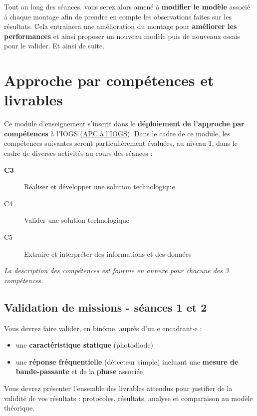 \documentclass[a4paper,11pt,twoside]{book} %
\begin{document}
{Tout au long des séances, vous serez alors amené à \textbf{modifier le modèle} associé à chaque montage afin de prendre en compte les observations faites sur les résultats. Cela entrainera une amélioration du montage pour \textbf{améliorer les performances} et ainsi proposer un nouveau modèle puis de nouveaux essais pour le valider. Et ainsi de suite.

\newpage
\section{Approche par compétences et livrables}

Ce module d'enseignement s'inscrit dans le \textbf{déploiement de l'approche par compétences} à l'IOGS (\href{https://tinyurl.com/APC-IOGS}{APC à l'IOGS}). Dans le cadre de ce module, les compétences suivantes seront particulièrement évaluées, au niveau 1, dans le cadre de diverses activités au cours des séances :

\begin{description}
	\item[\textbf{C3}] Réaliser et développer une solution technologique
	\item[C4] Valider une solution technologique
	\item[C5] Extraire et interpréter des informations et des données
\end{description}

\textit{La description des compétences est fournie en annexe pour chacune des 3 compétences.}


\subsection{Validation de missions - séances 1 et 2}

Vous devrez faire valider, en binôme, auprès d'un$\cdot$e encadrant$\cdot$e :

\begin{itemize}
	\item une \textbf{caractéristique statique} (photodiode)
	\item une \textbf{réponse fréquentielle} (détecteur simple) incluant une \textbf{mesure de bande-passante} et de la \textbf{phase} associée
\end{itemize}

Vous devrez présenter l'ensemble des livrables attendus pour justifier de la validité de vos résultats : protocoles, résultats, analyse et comparaison au modèle théorique. %


}
\end{document}
